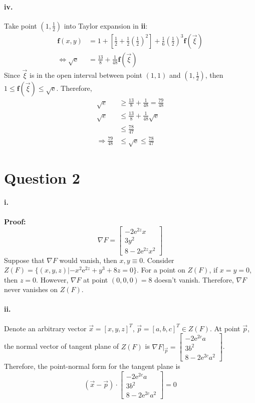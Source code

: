 \documentclass[11pt, a4paper]{article}
\begin{document}
\paragraph{iv.} Take point $(1, \frac{1}{2})$ into Taylor expansion in \textbf{ii}:
$$\begin{aligned}
    \bm{f}(x, y) &= 1 + [\frac{1}{2} + \frac{1}{2}(\frac{1}{2}) ^ 2] + \frac{1}{6}(\frac{1}{2}) ^ 3 \bm{f}(\vec{\xi}) \\
    \Leftrightarrow
    \sqrt{\mathrm{e}} &= \frac{13}{8} + \frac{1}{48}\bm{f}(\vec{\xi})
\end{aligned}$$
Since $\vec{\xi}$ is in the open interval between point $(1, 1)$ and $(1, \frac{1}{2})$, then $1 \leq \bm{f}(\vec{\xi}) \leq \sqrt{\mathrm{e}}$. Therefore, 
$$\begin{aligned}
    \sqrt{e} &\geq \frac{13}{8} + \frac{1}{48} = \frac{79}{48} \\
    \sqrt{e} &\leq \frac{13}{8} + \frac{1}{48}\sqrt{\mathrm{e}} \\
    &\leq \frac{78}{47} \\
    \Rightarrow
    \frac{79}{48} &\leq \sqrt{\mathrm{e}} \leq \frac{78}{47}
\end{aligned}$$

\section*{Question 2}
\paragraph{i.} \textbf{Proof:}
$$\nabla F = 
\begin{bmatrix}
    -2\mathrm{e}^{2z}x \\
    3y^2 \\
    8 - 2\mathrm{e}^{2z}x^2
\end{bmatrix}$$
Suppose that $\nabla F$ would vanish, then $x, y \equiv 0$. Consider $Z(F) = \{(x, y, z) | -x^2\mathrm{e}^{2z} + y^3 + 8z = 0\}$. For a point on $Z(F)$, if $x = y = 0$, then $z = 0$. However, $\nabla F$ at point $(0, 0, 0) = 8$ doesn't vanish. Therefore, $\nabla F$ never vanishes on $Z(F)$.
\paragraph{ii.}
Denote an arbitrary vector $\vec{x} = [x, y, z]^T$, $\vec{p} = [a, b, c]^T \in Z(F)$. At point $\vec{p}$, the normal vector of tangent plane of $Z(F)$ is $\nabla F|_{\vec{p}} = 
\begin{bmatrix}
    -2\mathrm{e}^{2c}a \\
    3b^2 \\
    8 - 2\mathrm{e}^{2c}a^2
\end{bmatrix}$. \\
Therefore, the point-normal form for the tangent plane is
$$(\vec{x} - \vec{p}) \cdot 
\begin{bmatrix}
    -2\mathrm{e}^{2c}a \\
    3b^2 \\
    8 - 2\mathrm{e}^{2c}a^2
\end{bmatrix} = 0$$
\end{document}
